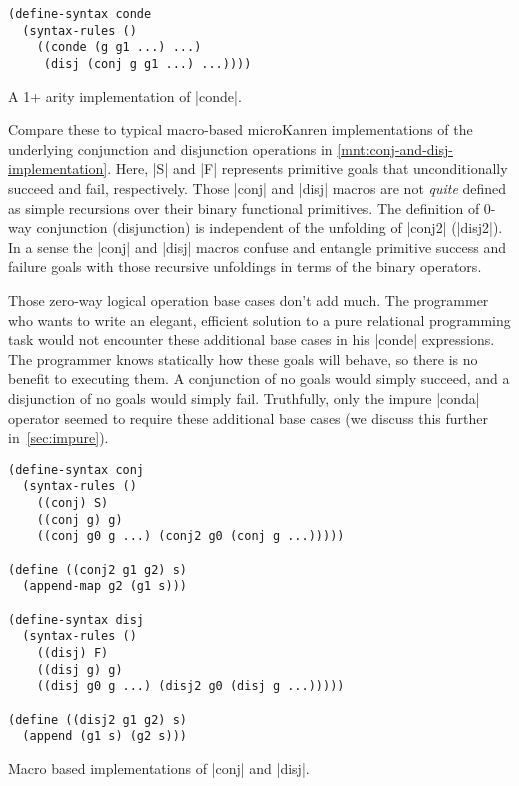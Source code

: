 \documentclass[sigplan,screen,draft,anonymous,review,natbib=false]{acmart}
\begin{document}
\begin{listing}
  \begin{verbatim}
(define-syntax conde
  (syntax-rules ()
    ((conde (g g1 ...) ...)
     (disj (conj g g1 ...) ...))))
  \end{verbatim}
\caption{A 1+ arity implementation of \rackinline|conde|.}
  \label{mnt:conde-implementation}
\end{listing}

Compare these to typical macro-based microKanren implementations of
the underlying conjunction and disjunction operations in
\cref{mnt:conj-and-disj-implementation}. Here, \rackinline|S| and
\rackinline|F| represents primitive goals that unconditionally succeed
and fail, respectively. Those \rackinline|conj| and \rackinline|disj|
macros are not \emph{quite} defined as simple recursions over their
binary functional primitives. The definition of 0-way conjunction
(disjunction) is independent of the unfolding of \rackinline|conj2|
(\rackinline|disj2|). In a sense the \rackinline|conj| and
\rackinline|disj| macros confuse and entangle primitive success and
failure goals with those recursive unfoldings in terms of the binary
operators.

Those zero-way logical operation base cases don't add much. The
programmer who wants to write an elegant, efficient solution to a pure
relational programming task would not encounter these additional base
cases in his \rackinline|conde| expressions. The programmer knows
statically how these goals will behave, so there is no benefit to
executing them. A conjunction of no goals would simply succeed, and a
disjunction of no goals would simply fail. Truthfully, only the impure
\rackinline|conda| operator seemed to require these additional base
cases (we discuss this further in~\cref{sec:impure}).

\begin{listing}
  \begin{verbatim}
(define-syntax conj
  (syntax-rules ()
    ((conj) S)
    ((conj g) g)
    ((conj g0 g ...) (conj2 g0 (conj g ...)))))

(define ((conj2 g1 g2) s)
  (append-map g2 (g1 s)))

(define-syntax disj
  (syntax-rules ()
    ((disj) F)
    ((disj g) g)
    ((disj g0 g ...) (disj2 g0 (disj g ...)))))

(define ((disj2 g1 g2) s)
  (append (g1 s) (g2 s)))
  \end{verbatim}
  \caption{Macro based implementations of \rackinline|conj| and \rackinline|disj|.}
  \label{mnt:conj-and-disj-implementation}
\end{listing}
\end{document}
